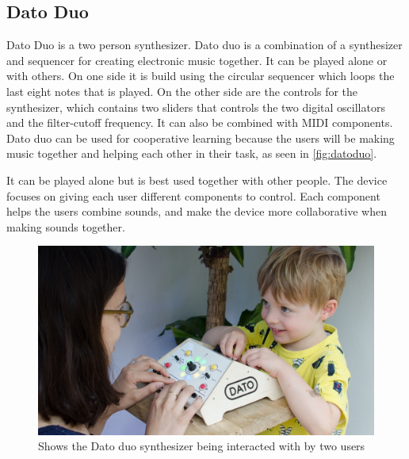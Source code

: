 \subsection{Dato Duo} 
Dato Duo is a two person synthesizer. Dato duo is a combination of a synthesizer and sequencer for creating electronic music together. It can be played alone or with others. On one side it is build using the circular sequencer which loops the last eight notes that is played. On the other side are the controls for the synthesizer, which contains two sliders that controls the two digital oscillators and the filter-cutoff frequency. It can also be combined with MIDI components. Dato duo can be used for cooperative learning because the users will be making music together and helping each other in their task, as seen in \autoref{fig:datoduo}.

It can be played alone but is best used together with other people. The device focuses on giving each user different components to control. Each component helps the users combine sounds, and make the device more collaborative when making sounds together.
\begin{figure}[H]
	\centering
	\includegraphics[width=0.7\linewidth]{figure/Analysis/datoduo}
	\caption{Shows the Dato duo synthesizer being interacted with by two users}
	\label{fig:datoduo}
\end{figure}

